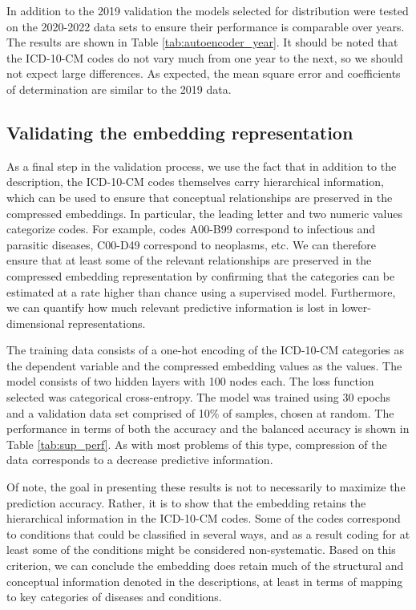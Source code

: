 \documentclass{bmcart}
\begin{document}
In addition to the 2019 validation the models selected for distribution were
tested on the 2020-2022 data sets to ensure their performance is comparable
over years. The results are shown in Table \ref{tab:autoencoder_year}. 
It should be noted that the ICD-10-CM codes do not vary much from
one year to the next, so we should not expect large differences. As 
expected, the mean square error and coefficients of determination are similar 
to the 2019 data.

\subsection*{Validating the embedding representation}

As a final step in the validation process, we use the fact that in addition to
the description, the ICD-10-CM codes themselves carry hierarchical information,
which can be used to ensure that conceptual relationships are preserved
in the compressed embeddings. In particular, the leading letter and two 
numeric values categorize codes. For example, codes A00-B99 correspond to
infectious and parasitic diseases, C00-D49 correspond to neoplasms, etc. We
can therefore ensure that at least some of the relevant relationships are 
preserved in the compressed embedding representation by confirming that
the categories can be estimated at a rate higher than chance using a 
supervised model. Furthermore, we can quantify how much relevant predictive
information is lost in lower-dimensional representations.

The training data consists of a one-hot encoding of the ICD-10-CM
categories as the dependent variable and the compressed embedding values as
the values. The model consists of two hidden layers with 100
nodes each. The loss function selected was categorical cross-entropy. The
model was trained using 30 epochs and a validation data set comprised of 10\% of
samples, chosen at random. The performance in terms of both the accuracy and
the balanced accuracy is shown in Table \ref{tab:sup_perf}. As
with most problems of this type, compression of the data corresponds to
a decrease predictive information.

Of note, the goal in presenting these results is not to necessarily to 
maximize the prediction accuracy. Rather, it is to show that the embedding 
retains the
hierarchical information in the ICD-10-CM codes. Some of the codes correspond to
conditions that could be classified in several ways, and as a result coding
for at least some of the conditions might be considered non-systematic.
Based on this criterion, we can conclude the embedding does retain much of the 
structural and conceptual information denoted in the descriptions, at least in 
terms of mapping to key categories of diseases and conditions.
\end{document}
